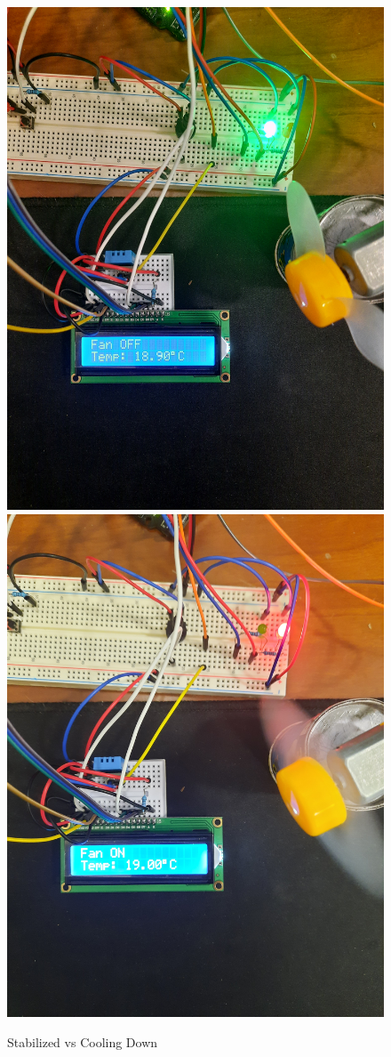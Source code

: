 \begin{figure}[H]
    \centering
    \includegraphics[scale=0.05,angle=-90]{images/testes/sisB_on.jpg}
    \includegraphics[scale=0.05,angle=-90]{images/testes/sisB_off.jpg}
    \caption{Stabilized vs Cooling Down}
\end{figure}
